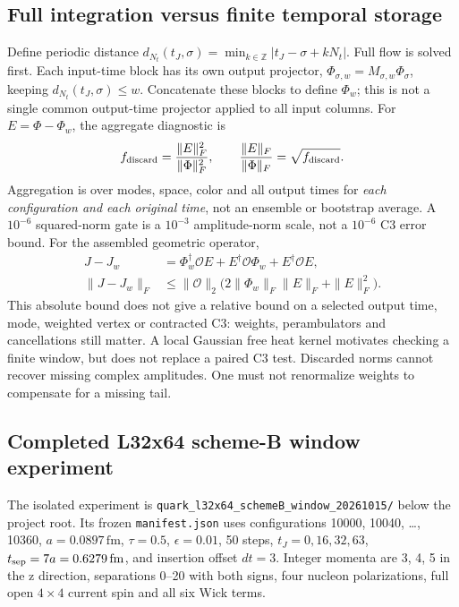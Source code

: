 \documentclass[11pt]{article}
\numberwithin{equation}{section}
\begin{document}
\subsection{Full integration versus finite temporal storage}

Define periodic distance
\(d_{N_t}(t_J,\sigma)=\min_{k\in\mathbb Z}|t_J-\sigma+kN_t|\).
Full flow is solved first. Each input-time block has its own output
projector, \(\Phi_{\sigma,w}=M_{\sigma,w}\Phi_\sigma\), keeping
\(d_{N_t}(t_J,\sigma)\le w\). Concatenate these blocks to define
\(\Phi_w\); this is not a single common output-time projector applied
to all input columns. For \(E=\Phi-\Phi_w\), the aggregate diagnostic is
\begin{equation}
 f_{\rm discard}=\frac{\|E\|_F^2}{\|\Phi\|_F^2},\qquad
 \frac{\|E\|_F}{\|\Phi\|_F}=\sqrt{f_{\rm discard}}.
 \label{eq:window-tail-oct15}
\end{equation}
Aggregation is over modes, space, color and all output times for
\emph{each configuration and each original time}, not an ensemble or
bootstrap average. A \(10^{-6}\) squared-norm gate is a \(10^{-3}\)
amplitude-norm scale, not a \(10^{-6}\) C3 error bound.
For the assembled geometric operator,
\begin{align}
 J-J_w&=\Phi_w^\dagger\mathcal O E+E^\dagger\mathcal O\Phi_w
        +E^\dagger\mathcal O E,\\
 \|J-J_w\|_F&\le\|\mathcal O\|_2
       \bigl(2\|\Phi_w\|_F\|E\|_F+\|E\|_F^2\bigr).
 \label{eq:window-bound-oct15}
\end{align}
This absolute bound does not give a relative bound on a selected output
time, mode, weighted vertex or contracted C3: weights, perambulators and
cancellations still matter. A local Gaussian free heat kernel motivates
checking a finite window, but does not replace a paired C3 test.
Discarded norms cannot recover missing complex amplitudes. One must not
renormalize weights to compensate for a missing tail.

\subsection{Completed L32x64 scheme-B window experiment}

The isolated experiment is
\nolinkurl{quark_l32x64_schemeB_window_20261015/} below the project root.
Its frozen \texttt{manifest.json} uses configurations
10000, 10040, \ldots, 10360, \(a=0.0897\,\mathrm{fm}\),
\(\tau=0.5\), \(\epsilon=0.01\), 50 steps,
\(t_J=0,16,32,63\), \(t_{\rm sep}=7a=0.6279\,\mathrm{fm}\),
and insertion offset \(dt=3\). Integer momenta are 3, 4, 5 in the
z direction, separations 0--20 with both signs, four nucleon
polarizations, full open \(4\times4\) current spin and all six Wick terms.
\end{document}
